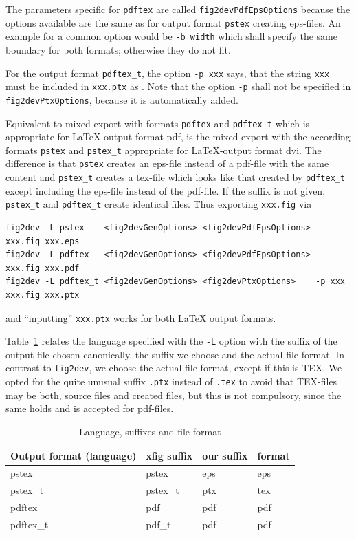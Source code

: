 
The parameters specific for \texttt{pdftex} 
are called \texttt{fig2devPdfEpsOptions} 
because the options available are the same 
as for output format \texttt{pstex} creating eps-files. 
An example for a common option would be \texttt{-b width} 
which shall specify the same boundary for both formats; 
otherwise they do not fit. 

For the output format \texttt{pdftex\_t}, 
the option \texttt{-p xxx} says, 
that the string \texttt{xxx} must be included in \texttt{xxx.ptx} 
as . 
Note that the option \texttt{-p} shall not be specified 
in \texttt{fig2devPtxOptions}, because it is automatically added. 

Equivalent to mixed export with formats \texttt{pdftex} and \texttt{pdftex\_t} 
which is appropriate for \LaTeX-output format pdf, 
is the mixed export with the according formats 
\texttt{pstex} and \texttt{pstex\_t} appropriate for \LaTeX-output format dvi. 
The difference is that \texttt{pstex} creates an eps-file instead of a pdf-file 
with the same content 
and \texttt{pstex\_t} creates a tex-file which looks like that 
created by \texttt{pdftex\_t} except including the eps-file 
instead of the pdf-file. 
If the suffix is not given, 
\texttt{pstex\_t} and \texttt{pdftex\_t} create identical files. 
Thus exporting \texttt{xxx.fig} via 
%
\begin{Verbatim}[fontsize=\scriptsize]
fig2dev -L pstex    <fig2devGenOptions> <fig2devPdfEpsOptions>        xxx.fig xxx.eps   
fig2dev -L pdftex   <fig2devGenOptions> <fig2devPdfEpsOptions>        xxx.fig xxx.pdf   
fig2dev -L pdftex_t <fig2devGenOptions> <fig2devPtxOptions>    -p xxx xxx.fig xxx.ptx
\end{Verbatim}
%
and ``inputting'' \texttt{xxx.ptx} works for both \LaTeX{} output formats. 

Table~\ref{tab:xfigSuffixes} relates the language specified with the \texttt{-L} option 
with the suffix of the output file chosen canonically, the suffix we choose 
and the actual file format. 
In contrast to \texttt{fig2dev}, 
we choose the actual file format, except if this is TEX\@. 
We opted for the quite unusual suffix \texttt{.ptx} 
instead of \texttt{.tex} 
to avoid that TEX-files may be both, 
source files and created files, 
but this is not compulsory, 
since the same holds and is accepted for pdf-files. 

\begin{longtable}{|l|lll|}
\toprule
Output format (language) & xfig suffix & our suffix & format \\
\midrule
\midrule
\endfirsthead%
\bottomrule%
\caption{\label{tab:xfigSuffixes} Language, suffixes and file format }
\endlastfoot%
pstex                    & pstex       & eps        & eps \\
pstex\_t                 & pstex\_t    & ptx        & tex \\
pdftex                   & pdf         & pdf        & pdf \\
pdftex\_t                & pdf\_t      & pdf        & pdf \\
\end{longtable}


